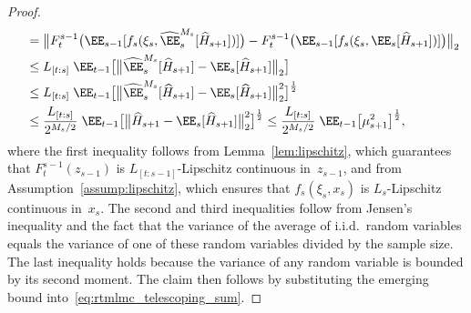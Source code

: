 \documentclass[11pt]{article}
\let\hat\widehat
\begin{document}
\begin{proof}
\begin{align*}
    &\quad = \big\| F_t^{s-1}\big(\EE_{s-1}[f_s(\xi_s,\hat\EE_s^{M_s}[\hat{H}_{s+1}])]\big) - F_t^{s-1}\big(\EE_{s-1}[f_s(\xi_s,\EE_s[\hat{H}_{s+1}])]\big)\big\|_2\\
    &\quad \leq L_{[t:s]} \; \EE_{t-1}\big[ \big\|\hat\EE_s^{M_s}[\hat{H}_{s+1}] - \EE_s[\hat{H}_{s+1}] \big\|_2 \big] \\
    &\quad \leq L_{[t:s]} \; \EE_{t-1}\big[ \big\|\hat\EE_s^{M_s}[\hat{H}_{s+1}] - \EE_s[\hat{H}_{s+1}] \big\|_2^2 \big]^\frac{1}{2} \\
    & \quad \leq \frac{L_{[t:s]}}{2^{M_s/2}} \; \EE_{t-1}\big[\big\|\hat{H}_{s+1} - \EE_s[\hat{H}_{s+1}]\big\|_2^2\big]^{\frac{1}{2}} \leq \frac{L_{[t:s]}}{2^{M_s/2}} \; \EE_{t-1}\big[ \mu^2_{s+1} \big]^\frac{1}{2},
\end{align*}
where the first inequality follows from Lemma~\ref{lem:lipschitz}, which guarantees that $F_t^{s-1}(z_{s-1})$ is $L_{[t:s-1]}$-Lipschitz continuous in~$z_{s-1}$, and from Assumption~\ref{assump:lipschitz}, which ensures that $f_s(\xi_s, x_s)$ is $L_s$-Lipschitz continuous in~$x_s$. The second and third inequalities follow from Jensen's inequality and the fact that the variance of the average of i.i.d.\ random variables equals the variance of one of these random variables divided by the sample size. The last inequality holds because the variance of any random variable is bounded by its second moment. The claim then follows by substituting the emerging bound into~\eqref{eq:rtmlmc_telescoping_sum}. 



\end{proof}
\end{document}
